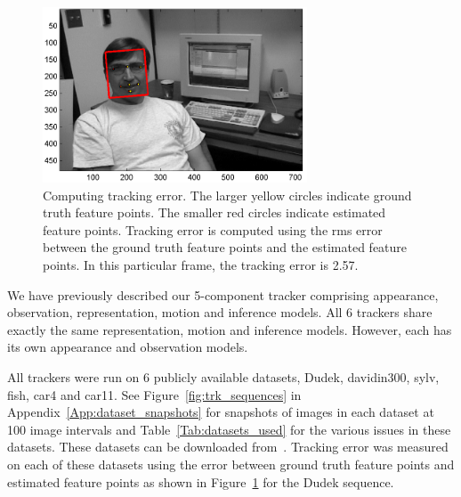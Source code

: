 \begin{Body}
								\begin{figure}[t]
								\centering
								\includegraphics[width=0.7\textwidth]{thesis/results_pca__trk_dudek_0007.png}
								\caption{Computing tracking error.  The larger yellow circles indicate ground truth feature points.  The smaller red circles indicate estimated feature points.  Tracking error is computed using the rms error between the ground truth feature points and the estimated feature points.  In this particular frame, the tracking error is 2.57.}
								\label{fig:results_pca__trk_dudek_0007}
								\end{figure}

We have previously described our 5-component tracker comprising appearance, observation, representation, motion and inference models.  All 6 trackers share exactly the same representation, motion and inference models.  However, each has its own appearance and observation models.

All trackers were run on 6 publicly available datasets, Dudek, davidin300, sylv, fish, car4 and car11.  See Figure~\ref{fig:trk_sequences} in Appendix~\ref{App:dataset_snapshots} for snapshots of images in each dataset at 100 image intervals and Table~\ref{Tab:datasets_used} for the various issues in these datasets.  These datasets can be downloaded from~\cite{2008_JNL_subspaceTRK_Ross}.  Tracking error was measured on each of these datasets using the error between ground truth feature points and estimated feature points as shown in Figure~\ref{fig:results_pca__trk_dudek_0007} for the Dudek sequence.


\end{Body}

